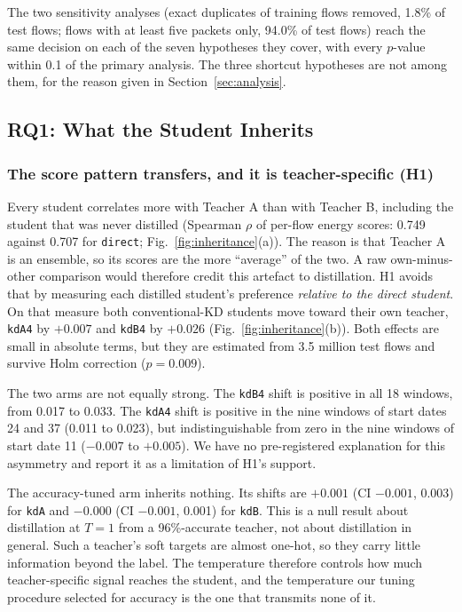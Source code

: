 \documentclass[journal]{IEEEtran}
\newcommand{\kd}[1]{\texttt{#1}}
\begin{document}
The two sensitivity analyses (exact duplicates of training flows removed, 1.8\% of test flows; flows with at least five packets only, 94.0\% of test flows) reach the same decision on each of the seven hypotheses they cover, with every $p$-value within 0.1 of the primary analysis. The three shortcut hypotheses are not among them, for the reason given in Section~\ref{sec:analysis}.

\subsection{RQ1: What the Student Inherits}

\subsubsection*{The score pattern transfers, and it is teacher-specific (H1)}
Every student correlates more with Teacher A than with Teacher B, including the student that was never distilled (Spearman $\rho$ of per-flow energy scores: 0.749 against 0.707 for \kd{direct}; Fig.~\ref{fig:inheritance}(a)). The reason is that Teacher A is an ensemble, so its scores are the more ``average'' of the two. A raw own-minus-other comparison would therefore credit this artefact to distillation. H1 avoids that by measuring each distilled student's preference \emph{relative to the direct student}. On that measure both conventional-KD students move toward their own teacher, \kd{kdA4} by $+0.007$ and \kd{kdB4} by $+0.026$ (Fig.~\ref{fig:inheritance}(b)). Both effects are small in absolute terms, but they are estimated from 3.5 million test flows and survive Holm correction ($p=0.009$).

The two arms are not equally strong. The \kd{kdB4} shift is positive in all 18 windows, from 0.017 to 0.033. The \kd{kdA4} shift is positive in the nine windows of start dates 24 and 37 (0.011 to 0.023), but indistinguishable from zero in the nine windows of start date 11 ($-0.007$ to $+0.005$). We have no pre-registered explanation for this asymmetry and report it as a limitation of H1's support.

The accuracy-tuned arm inherits nothing. Its shifts are $+0.001$ (CI $-0.001$, 0.003) for \kd{kdA} and $-0.000$ (CI $-0.001$, 0.001) for \kd{kdB}. This is a null result about distillation at $T=1$ from a 96\%-accurate teacher, not about distillation in general. Such a teacher's soft targets are almost one-hot, so they carry little information beyond the label. The temperature therefore controls how much teacher-specific signal reaches the student, and the temperature our tuning procedure selected for accuracy is the one that transmits none of it.
\end{document}
